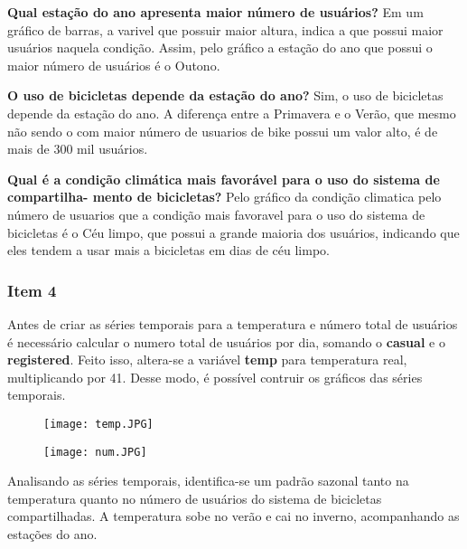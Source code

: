 \documentclass[a4paper,11pt]{article}
\begin{document}
    \textbf{Qual estação do ano apresenta maior número de usuários?} Em um gráfico de barras, a varivel que possuir maior altura, indica a que possui maior usuários naquela condição. Assim, pelo gráfico a estação do ano que possui o maior número de usuários é o Outono.

    \textbf{O uso de bicicletas depende da estação do ano?} Sim, o uso de bicicletas depende da estação do ano. A diferença entre a Primavera e o Verão, que mesmo não sendo o com maior número de usuarios de bike possui um valor alto, é de mais de 300 mil usuários.

    \textbf{Qual é a condição climática mais favorável para o uso do sistema de compartilha-
mento de bicicletas?} Pelo gráfico da condição climatica pelo número de usuarios que a condição mais favoravel para o uso do sistema de bicicletas é o Céu limpo, que possui a grande maioria dos usuários, indicando que eles tendem a usar mais a bicicletas em dias de céu limpo.

\newpage
\subsubsection{Item 4}

Antes de criar as séries temporais para a temperatura e número total de usuários é necessário calcular o numero total de usuários por dia, somando o \textbf{casual} e o \textbf{registered}. Feito isso, altera-se a variável \textbf{temp} para temperatura real, multiplicando por 41. Desse modo, é possível contruir os gráficos das séries temporais.


   \begin{figure}[h!]
    \centering
    \begin{minipage}{0.45\textwidth}
        \centering
        \texttt{[image: temp.JPG]}
        \caption{}
        \label{fig:fig1}
    \end{minipage}\hfill
    \begin{minipage}{0.45\textwidth}
        \centering
        \texttt{[image: num.JPG]}
        \caption{}
        \label{fig:fig2}
    \end{minipage}
\end{figure}

Analisando as séries temporais, identifica-se um padrão sazonal tanto na temperatura quanto no número de usuários do sistema de bicicletas compartilhadas. A temperatura sobe no verão e cai no inverno, acompanhando as estações do ano.
\end{document}
